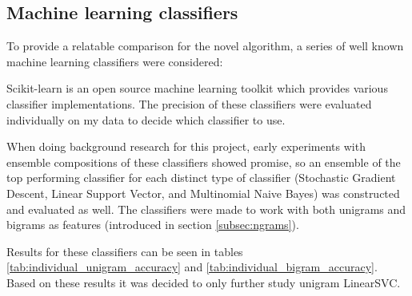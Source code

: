 \documentclass[a4paper,11pt]{kth-mag}
\begin{document}
\clearpage
\subsection{Machine learning classifiers}
To provide a relatable comparison for the novel algorithm, a series of well known machine learning
classifiers were considered:

Scikit-learn\cite{scikit-learn} is an open source machine learning toolkit which provides various
classifier implementations.
The precision of these classifiers were evaluated individually on my data to decide which classifier to use.

When doing background research for this project, early experiments with ensemble compositions of these classifiers
showed promise, so an ensemble of the top performing classifier for each distinct type of classifier
(Stochastic Gradient Descent, Linear Support Vector, and Multinomial Naive Bayes)
was constructed and evaluated as well. The classifiers were made to work with both unigrams and bigrams
as features (introduced in section \ref{subsec:ngrams}).

Results for these classifiers can be seen in tables
\ref{tab:individual_unigram_accuracy} and \ref{tab:individual_bigram_accuracy}.
Based on these results it was decided to only further study unigram LinearSVC.
\end{document}
